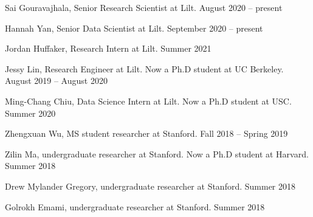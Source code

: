 
Sai Gouravajhala, Senior Research Scientist at Lilt. \hfill August 2020 -- present

Hannah Yan, Senior Data Scientist at Lilt. \hfill September 2020 -- present

Jordan Huffaker, Research Intern at Lilt. \hfill Summer 2021

Jessy Lin, Research Engineer at Lilt. Now a Ph.D student at UC Berkeley. \hfill August 2019 -- August 2020

Ming-Chang Chiu, Data Science Intern at Lilt. Now a Ph.D student at USC. \hfill Summer 2020

Zhengxuan Wu, MS student researcher at Stanford. \hfill Fall 2018 -- Spring 2019

Zilin Ma, undergraduate researcher at Stanford. Now a Ph.D student at Harvard. \hfill Summer 2018

Drew Mylander Gregory, undergraduate researcher at Stanford. \hfill Summer 2018

Golrokh Emami, undergraduate researcher at Stanford. \hfill Summer 2018\\

